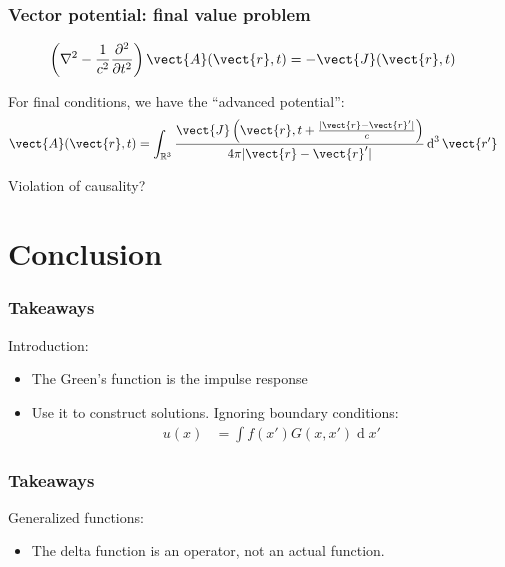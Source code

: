 \documentclass[12 pt, compress, handout, intlimits]{beamer}
\renewcommand{\d}{\operatorname{d}}
\begin{document}
\note{}

\begin{frame}[fragile]
    \frametitle{Vector potential: final value problem}
    
    \begin{align*}
        \left( \nabla^2 - \frac{1}{c^2} \frac{\partial^2}{\partial t^2} \right) \vect{A}(\vect{r}, t) &= - \vect{J}(\vect{r}, t)
    \end{align*}
    
    For final conditions, we have the ``advanced potential'':
    \begin{align*}
        \vect{A}(\vect{r}, t) &= \int_{\mathbb{R}^3} \frac{\vect{J}\left(\vect{r}, t + \frac{|\vect{r} - \vect{r}'|}{c}\right)}{4 \pi |\vect{r} - \vect{r}'|} \d^3 \vect{r'}
    \end{align*}

    Violation of causality?
    
\end{frame}

\note{}
\fi

\section{Conclusion}
\label{sec:conclusion}

\note{}

\begin{frame}[fragile]
    \frametitle{Takeaways}

    Introduction:
    \begin{itemize}
    \item
        The Green's function is the impulse response
    \item
        Use it to construct solutions. Ignoring boundary conditions:
        \begin{align*}
            u(x) &= \int f(x') G(x,x') \d x'
        \end{align*}
    \end{itemize}
    
\end{frame}

\note{}

\ifextended
\begin{frame}[fragile]
    \frametitle{Takeaways}

    Generalized functions:
    \begin{itemize}
    \item
        The delta function is an operator, not an actual function.
    \end{itemize}
   
\end{frame}
\end{document}
